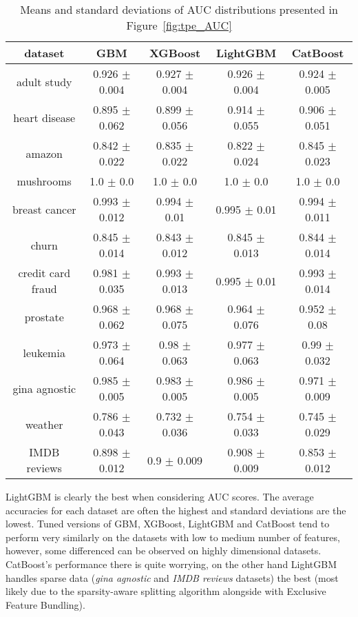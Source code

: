 \documentclass[magisterska, english]{pwr_wmat_praca_dyplomowa}
\theoremstyle{plain}
\numberwithin{theorem}{chapter}
\theoremstyle{definition}
\numberwithin{theorem}{chapter}
\newcommand{\gbm}{GBM, XGBoost, LightGBM and CatBoost }
\begin{document}
\begin{table}[h!]
\centering
\begin{tabular}{|c|c|c|c|c|}
\hline
\textbf{dataset}  & \textbf{GBM}  & \textbf{XGBoost}  & \textbf{LightGBM}  & \textbf{CatBoost} \\ \hline
adult study & 0.926 $\pm$ 0.004 & \cellcolor{green}0.927 $\pm$ 0.004 & 0.926 $\pm$ 0.004 & \cellcolor{red}0.924 $\pm$ 0.005\\ \hline
heart disease & \cellcolor{red}0.895 $\pm$ 0.062 & 0.899 $\pm$ 0.056 & \cellcolor{green}0.914 $\pm$ 0.055 & 0.906 $\pm$ 0.051\\ \hline
amazon & 0.842 $\pm$ 0.022 & 0.835 $\pm$ 0.022 & \cellcolor{red}0.822 $\pm$ 0.024 & \cellcolor{green}0.845 $\pm$ 0.023\\ \hline
mushrooms & 1.0 $\pm$ 0.0 & 1.0 $\pm$ 0.0 & 1.0 $\pm$ 0.0 & 1.0 $\pm$ 0.0\\ \hline
breast cancer & \cellcolor{red}0.993 $\pm$ 0.012 & 0.994 $\pm$ 0.01 & \cellcolor{green}0.995 $\pm$ 0.01 & 0.994 $\pm$ 0.011\\ \hline
churn & 0.845 $\pm$ 0.014 & \cellcolor{red}0.843 $\pm$ 0.012 & \cellcolor{green}0.845 $\pm$ 0.013 & 0.844 $\pm$ 0.014\\ \hline
credit card fraud & \cellcolor{red}0.981 $\pm$ 0.035 & 0.993 $\pm$ 0.013 & \cellcolor{green}0.995 $\pm$ 0.01 & 0.993 $\pm$ 0.014\\ \hline
prostate & \cellcolor{green}0.968 $\pm$ 0.062 & 0.968 $\pm$ 0.075 & 0.964 $\pm$ 0.076 & \cellcolor{red}0.952 $\pm$ 0.08\\ \hline
leukemia & \cellcolor{red}0.973 $\pm$ 0.064 & 0.98 $\pm$ 0.063 & 0.977 $\pm$ 0.063 & \cellcolor{green}0.99 $\pm$ 0.032\\ \hline
gina agnostic & 0.985 $\pm$ 0.005 & 0.983 $\pm$ 0.005 & \cellcolor{green}0.986 $\pm$ 0.005 & \cellcolor{red}0.971 $\pm$ 0.009\\ \hline
weather & \cellcolor{green}0.786 $\pm$ 0.043 & \cellcolor{red}0.732 $\pm$ 0.036 & 0.754 $\pm$ 0.033 & 0.745 $\pm$ 0.029\\ \hline
IMDB reviews & 0.898 $\pm$ 0.012 & 0.9 $\pm$ 0.009 & \cellcolor{green}0.908 $\pm$ 0.009 & \cellcolor{red}0.853 $\pm$ 0.012\\ \hline
\end{tabular}
\caption{Means and standard deviations of AUC distributions presented in Figure~\ref{fig:tpe_AUC}}
\label{tab:tpe_AUC}
\end{table}

LightGBM is clearly the best when considering AUC scores. The average accuracies for each dataset are often the highest and standard deviations are the lowest. Tuned versions of \gbm tend to perform very similarly on the datasets with low to medium number of features, however, some differenced can be observed on highly dimensional datasets. CatBoost's performance there is quite worrying, on the other hand LightGBM handles sparse data (\emph{gina agnostic} and \emph{IMDB reviews} datasets) the best (most likely due to the sparsity-aware splitting algorithm alongside with Exclusive Feature Bundling).
\end{document}
